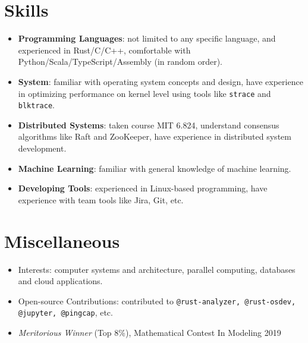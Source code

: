 \documentclass{resume}
\newcommand{\en}[1]{#1}
\newcommand{\zh}[1]{}
\begin{document}
\section{\en{Skills}\zh{技能}}
\begin{itemize}[parsep=0.25ex]
      \item \en{\textbf{Programming Languages}:
                  not limited to any specific language,
                  and experienced in Rust/C/C++,
                  comfortable with Python/Scala/TypeScript/Assembly (in random order).}
            \zh{\textbf{编程语言}:
                  不局限于特定编程语言，且尤其熟悉 Rust/C/C++ 等，
                  了解 Python/Scala/TypeScript 等（不分先后）。}

      \item \en{\textbf{System}:
                  familiar with operating system concepts and design,
                  have experience in optimizing performance on kernel level using tools
                  like \texttt{strace} and \texttt{blktrace}.}
            \zh{\textbf{系统}:
                  熟悉各种操作系统内核的概念与设计。}

      \item \en{\textbf{Distributed Systems}:
                  taken course MIT 6.824,
                  understand consensus algorithms like Raft and ZooKeeper,
                  have experience in distributed system development.}
            \zh{\textbf{分布式系统}:
                  熟悉 Raft 等算法，有分布式系统开发经验。}

      \item \en{\textbf{Machine Learning}:
                  familiar with general knowledge of machine learning.}
            \zh{\textbf{机器学习}:
                  熟悉经典机器学习算法。}

      \item \en{\textbf{Developing Tools}:
                  experienced in Linux-based programming,
                  have experience with team tools like Jira, Git, etc.}
            \zh{\textbf{开发工具}:
                  十分熟悉 Linux，有 Jira、Git 等团队合作工具的经验。}
\end{itemize}

\section{\en{Miscellaneous}\zh{其他}}
\begin{itemize}
      \item \en{Interests: computer systems and architecture, parallel computing, databases and cloud applications.}
            \zh{兴趣：分布式系统、存储、数据库、云计算应用等。}
      \item \en{Open-source Contributions: contributed to \texttt{@rust-analyzer, @rust-osdev, @jupyter, @pingcap}, etc.}
            \zh{开源贡献: 为 \texttt{@rust-analyzer, @rust-osdev, @jupyter, @pingcap} 等组织贡献过代码。}
      \item \textit{Meritorious Winner} (Top 8\%), Mathematical Contest In Modeling 2019
\end{itemize}
\end{document}

